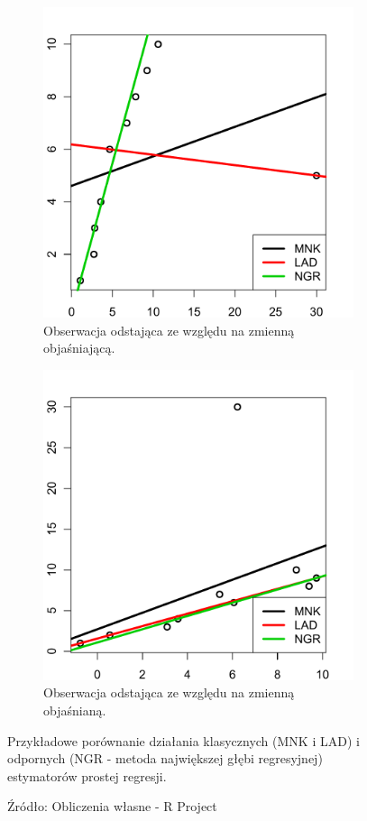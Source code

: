 \documentclass[a4paper,12pt,openany, DIV=calc, headsepline]{scrbook}
\begin{document}
\begin{figure}[H]
\begin{subfigure}[t]{0.45\textwidth}
  \includegraphics[width=\linewidth]{wykresy/ladout}
	\caption{Obserwacja odstająca ze względu na zmienną objaśniającą.}
	\label{lad1}  
\end{subfigure}
\begin{subfigure}[t]{0.45\textwidth}
  \includegraphics[width=\linewidth]{wykresy/ladouty}
  \caption{Obserwacja odstająca ze względu na zmienną objaśnianą.}
  \label{lad2}
\end{subfigure}
\caption{Przykładowe porównanie działania klasycznych (MNK i LAD) i odpornych (NGR - metoda największej głębi regresyjnej) estymatorów prostej regresji.}
\caption*{Źródło: Obliczenia własne - R Project}
\label{fig:lad}
\end{figure}
\end{document}
